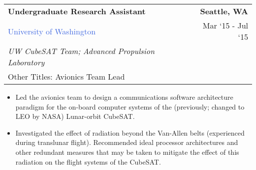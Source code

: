 \documentclass[10pt]{article}
\newcommand{\highlightcolor}{RoyalBlue}
\newcommand{\tabularxwidth}{\textwidth}
\begin{document}
    \begin{minipage}{\tabularxwidth}

        \begin{tabularx}{\tabularxwidth}{X r}
            \textbf{Undergraduate Research Assistant} & \textbf{Seattle, 
        WA} \\
            
    
    
    

    
        \textcolor{\highlightcolor}{University of Washington} & 
        
    Mar ‘15 - 
    Jul ‘15 \\
        
            \textit{UW CubeSAT Team;}
                \textit{Advanced Propulsion Laboratory} & \\
        
    
            
                Other Titles: Avionics Team Lead & \\
            
        \end{tabularx}

        \begin{itemize}[noitemsep, topsep=3pt, parsep=0pt, partopsep=0pt]
            
                \item 
    Led the avionics team to design a communications software architecture paradigm for the on-board computer systems of the (previously; changed to LEO by NASA) Lunar-orbit CubeSAT.
            
                \item 
    Investigated the effect of radiation beyond the Van-Allen belts (experienced during translunar flight). Recommended ideal processor architectures and other redundant measures that may be taken to mitigate the effect of this radiation on the flight systems of the CubeSAT.
            

\end{itemize}
\end{minipage}
\end{document}
